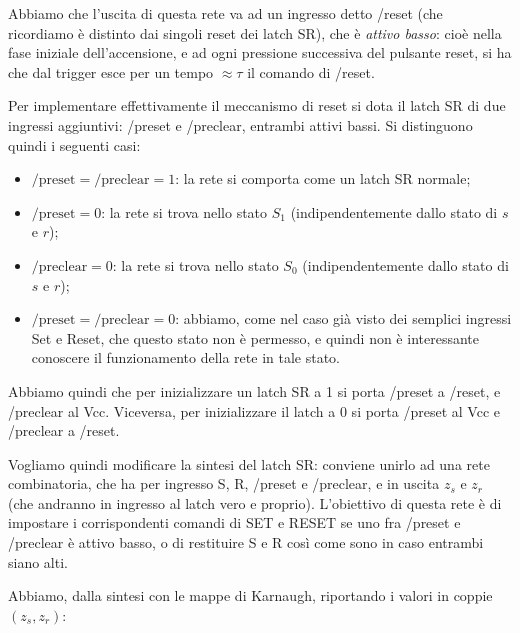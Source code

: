 \documentclass[a4paper,11pt]{article}
\begin{document}
Abbiamo che l'uscita di questa rete va ad un ingresso detto /reset (che ricordiamo è distinto dai singoli reset dei latch SR), che è \textit{attivo basso}: cioè nella fase iniziale dell'accensione, e ad ogni pressione successiva del pulsante reset, si ha che dal trigger esce per un tempo $\approx \tau$ il comando di /reset.

Per implementare effettivamente il meccanismo di reset si dota il latch SR di due ingressi aggiuntivi: /preset e /preclear, entrambi attivi bassi.
Si distinguono quindi i seguenti casi:
\begin{itemize}
	\item $\mathrm{/preset} = \mathrm{/preclear} = 1$: la rete si comporta come un latch SR normale;
	\item $\mathrm{/preset} = 0$: la rete si trova nello stato $S_1$ (indipendentemente dallo stato di $s$ e $r$);
	\item $\mathrm{/preclear} = 0$: la rete si trova nello stato $S_0$ (indipendentemente dallo stato di $s$ e $r$);
	\item $\mathrm{/preset} = \mathrm{/preclear} = 0$: abbiamo, come nel caso già visto dei semplici ingressi Set e Reset, che questo stato non è permesso, e quindi non è interessante conoscere il funzionamento della rete in tale stato.
\end{itemize}

Abbiamo quindi che per inizializzare un latch SR a 1 si porta /preset a /reset, e /preclear al Vcc.
Viceversa, per inizializzare il latch a 0 si porta /preset al Vcc e /preclear a /reset.

Vogliamo quindi modificare la sintesi del latch SR: conviene unirlo ad una rete combinatoria, che ha per ingresso S, R, /preset e /preclear, e in uscita $z_s$ e $z_r$ (che andranno in ingresso al latch vero e proprio).
L'obiettivo di questa rete è di impostare i corrispondenti comandi di SET e RESET se uno fra /preset e /preclear è attivo basso, o di restituire S e R così come sono in caso entrambi siano alti. 

Abbiamo, dalla sintesi con le mappe di Karnaugh, riportando i valori in coppie $(z_s, z_r)$:

\begin{center}
	\begin{karnaugh-map}[4][4][1][/preclear][/preset][R][S]
	\end{karnaugh-map}
\end{center}
\end{document}
